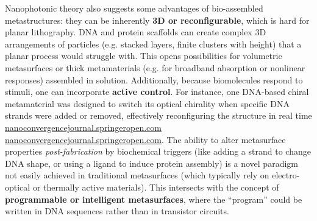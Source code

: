 \documentclass[11pt,a4paper]{article}
\begin{document}
Nanophotonic theory also suggests some advantages of bio-assembled metastructures: they can be inherently \textbf{3D or reconfigurable}, which is hard for planar lithography. DNA and protein scaffolds can create complex 3D arrangements of particles (e.g. stacked layers, finite clusters with height) that a planar process would struggle with. This opens possibilities for volumetric metasurfaces or thick metamaterials (e.g. for broadband absorption or nonlinear responses) assembled in solution. Additionally, because biomolecules respond to stimuli, one can incorporate \textbf{active control}. For instance, one DNA-based chiral metamaterial was designed to switch its optical chirality when specific DNA strands were added or removed, effectively reconfiguring the structure in real time \href{https://nanoconvergencejournal.springeropen.com/articles/10.1186/s40580-020-00226-7#:~:text=The changes of DNA alignment,metamaterial%2C and the building block}{nanoconvergencejournal.springeropen.com} \href{https://nanoconvergencejournal.springeropen.com/articles/10.1186/s40580-020-00226-7#:~:text=match at L334 that enabled,directed helical}{nanoconvergencejournal.springeropen.com}. The ability to alter metasurface properties \emph{post-fabrication} by biochemical triggers (like adding a strand to change DNA shape, or using a ligand to induce protein assembly) is a novel paradigm not easily achieved in traditional metasurfaces (which typically rely on electro-optical or thermally active materials). This intersects with the concept of \textbf{programmable or intelligent metasurfaces}, where the ``program'' could be written in DNA sequences rather than in transistor circuits.
\end{document}
